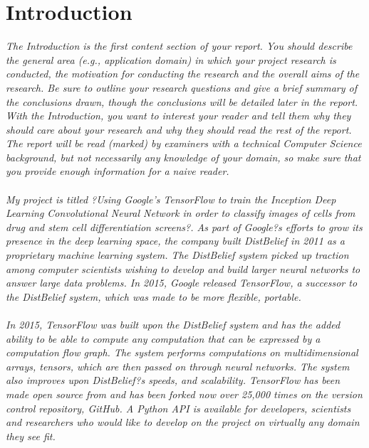 \section{Introduction}

\emph{The Introduction is the first content section of your report. You should describe the general area (e.g., application domain) in which your project research is conducted, the motivation for conducting the research and the overall aims of the research. Be sure to outline your research questions and give a brief summary of the conclusions drawn, though the conclusions will be detailed later in the report. With the Introduction, you want to interest your reader and tell them why they should care about your research and why they should read the rest of the report. The report will be read (marked) by examiners with a technical Computer Science background, but not necessarily any knowledge of your domain, so make sure that you provide enough information for a naive reader.\\ \\ 
My project is titled ?Using Google's TensorFlow to train the Inception Deep Learning Convolutional Neural Network in order to classify images of cells from drug and stem cell differentiation screens?. As part of Google?s efforts to grow its presence in the deep learning space, the company built DistBelief in 2011 as a proprietary machine learning system. The DistBelief system picked up traction among computer scientists wishing to develop and build larger neural networks to answer large data problems. In 2015, Google released TensorFlow, a successor to the DistBelief system, \cite{webiste:https://research.googleblog.com/2015/11/tensorflow-googles-latest-machine_9.html} which was made to be more flexible, portable. \\ \\ 
In 2015, TensorFlow was built upon the DistBelief system and has the added ability to be able to compute any computation that can be expressed by a computation flow graph. The system performs computations on multidimensional arrays, tensors, which are then passed on through neural networks. The system also improves upon DistBelief?s speeds, and scalability. TensorFlow has been made open source from and has been forked now over 25,000 times on the version control repository, GitHub. A Python API is available for developers, scientists and researchers who would like to develop on the project on virtually any domain they see fit. \\ \\ 
}
